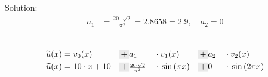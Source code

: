 \documentclass[
final,
a4paper,
oneside,
parskip=full,
headings=standardclasses,
headings=big,
pointednumbers,
fleqn
]{scrartcl}
\newcommand{\tfillgr}[1]{\tfillc[#1][Gray!20]}
\newcommand{\fs}[2]{{\scriptstyle\frac{#1}{#2}}}
\newcommand{\kl}[1]{{\left( #1 \right)}}
\begin{document}
    Solution: \\
    {\setlength{\abovedisplayskip}{-6pt}
    \setlength{\belowdisplayskip}{-24pt}
    \begin{align*}
    a_1 &= \fs{20 \cdot \sqrt{2}}{\pi^2} = 2.8658 = 2.9, \quad a_2 = 0 \\
    \end{align*}} \\
    {\setlength{\abovedisplayskip}{-12pt}
    \setlength{\belowdisplayskip}{-6pt}
    \begin{alignat*}{8}
        \widetilde{u}\kl{x} & = v_0\kl{x}       &{} \tfillgr{$+$} {} & a_1                           &{} \cdot {} &
                                v_1\kl{x}       &{} \tfillgr{$+$} {} & a_2 &{} \cdot {} & v_2\kl{x} \\
        \widetilde{u}\kl{x} & = 10 \cdot x + 10 &{} \tfillgr{$+$} {} & \fs{20 \cdot \sqrt{2}}{\pi^2} &{} \cdot {} &
                                \sin\kl{\pi x}  &{} \tfillgr{$+$} {} & 0 &{} \cdot {} & \sin\kl{2 \pi x} \\
    \end{alignat*}}
\end{document}
